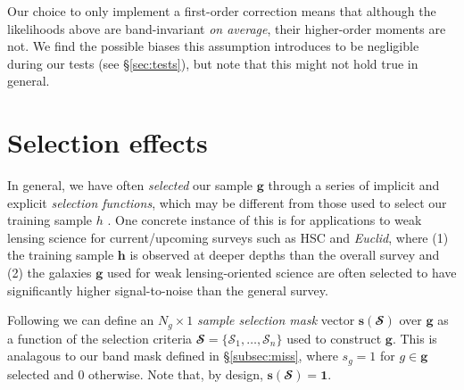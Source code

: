 \documentclass[a4paper,fleqn,usenatbib,english]{mnras}
\begin{document}
Our choice to only implement a first-order correction means that although the likelihoods above are band-invariant \textit{on average}, their higher-order moments are not. We find the possible biases this assumption introduces to be negligible during our tests (see \S\ref{sec:tests}), but note that this might not hold true in general.


\section{Selection effects}
\label{sec:sel}

In general, we have often \textit{selected} our sample $\mathbf{g}$ through a series of implicit and explicit \textit{selection functions}, which may be different from those used to select our training sample $h$ \citep[cf.][]{daylan+16}. One concrete instance of this is for applications to weak lensing science for current/upcoming surveys such as HSC and \textit{Euclid}, where (1) the training sample $\mathbf{h}$ is observed at deeper depths than the overall survey and (2) the galaxies $\mathbf{g}$ used for weak lensing-oriented science are often selected to have significantly higher signal-to-noise than the general survey.

Following \citet{leistedt+16} we can define an $N_g \times 1$ \textit{sample selection mask} vector $\mathbf{s}(\mathbfcal{S})$ over $\mathbf{g}$ as a function of the selection criteria $\mathbfcal{S}=\lbrace \mathcal{S}_1, \ldots, \mathcal{S}_n \rbrace$ used to construct $\mathbf{g}$. This is analagous to our band mask defined in \S\ref{subsec:miss}, where $s_g=1$ for $g \in \mathbf{g}$ selected and $0$ otherwise. Note that, by design, $\mathbf{s}(\mathbfcal{S})=\mathbf{1}$.
\end{document}
